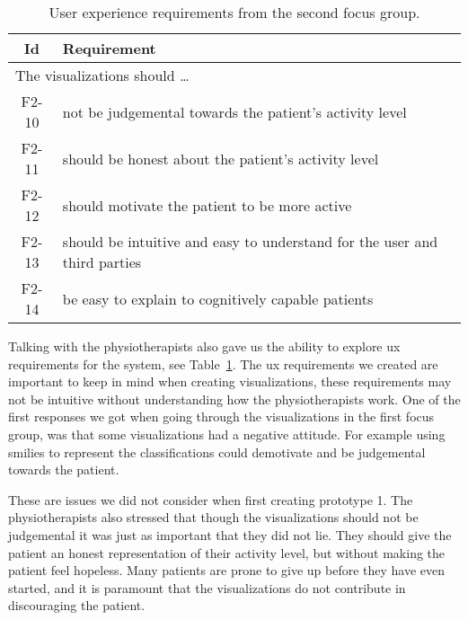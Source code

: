 \begin{table}[h!]
  \begin{center}
  \begin{tabular}{|c|p{12cm}|}
    \hline
      \textbf{Id} & \textbf{Requirement} \\ \hline
    \multicolumn{2}{|l|}{The visualizations should \ldots} \\ \hline
      F2-10 & not be judgemental towards the patient's activity level \\ \hline
      F2-11 & should be honest about the patient's activity level \\ \hline
      F2-12 & should motivate the patient to be more active \\ \hline
      F2-13 & should be intuitive and easy to understand for the user and third parties \\ \hline
      F2-14 & be easy to explain to cognitively capable patients \\ \hline
  \end{tabular}
  \end{center}
  \caption[User experience requirements after the second focus group.]{User experience requirements from the second focus group.}
  \label{tab:f2ReqUx}
\end{table}

Talking with the physiotherapists also gave us the ability to explore \gls{ux} requirements for the system, see Table~\ref{tab:f2ReqUx}. The \gls{ux} requirements we created are important to keep in mind when creating visualizations, these requirements may not be intuitive without understanding how the physiotherapists work. One of the first responses we got when going through the visualizations in the first focus group, was that some visualizations had a negative attitude. For example using smilies to represent the classifications could demotivate and be judgemental towards the patient. 

These are issues we did not consider when first creating prototype 1. The physiotherapists also stressed that though the visualizations should not be judgemental it was just as important that they did not lie. They should give the patient an honest representation of their activity level, but without making the patient feel hopeless. Many patients are prone to give up before they have even started, and it is paramount that the visualizations do not contribute in discouraging the patient.

